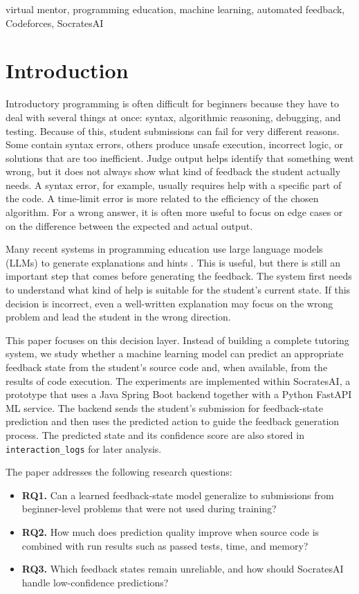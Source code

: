 \documentclass[conference]{IEEEtran}
\begin{document}
\begin{IEEEkeywords}
virtual mentor, programming education, machine learning, automated feedback, Codeforces, SocratesAI
\end{IEEEkeywords}

\section{Introduction}

Introductory programming is often difficult for beginners because they have to deal with several things at once: syntax, algorithmic reasoning, debugging, and testing. Because of this, student submissions can fail for very different reasons. Some contain syntax errors, others produce unsafe execution, incorrect logic, or solutions that are too inefficient. Judge output helps identify that something went wrong, but it does not always show what kind of feedback the student actually needs. A syntax error, for example, usually requires help with a specific part of the code. A time-limit error is more related to the efficiency of the chosen algorithm. For a wrong answer, it is often more useful to focus on edge cases or on the difference between the expected and actual output.

Many recent systems in programming education use large language models (LLMs) to generate explanations and hints \cite{Denny2024,Ahamed2025,CodeAid2024,Iris2024}. This is useful, but there is still an important step that comes before generating the feedback. The system first needs to understand what kind of help is suitable for the student's current state. If this decision is incorrect, even a well-written explanation may focus on the wrong problem and lead the student in the wrong direction.

This paper focuses on this decision layer. Instead of building a complete tutoring system, we study whether a machine learning model can predict an appropriate feedback state from the student's source code and, when available, from the results of code execution. The experiments are implemented within SocratesAI, a prototype that uses a Java Spring Boot backend together with a Python FastAPI ML service. The backend sends the student's submission for feedback-state prediction and then uses the predicted action to guide the feedback generation process. The predicted state and its confidence score are also stored in \texttt{interaction\_logs} for later analysis.

The paper addresses the following research questions:
\begin{itemize}
    \item \textbf{RQ1.} Can a learned feedback-state model generalize to submissions from beginner-level problems that were not used during training?
    \item \textbf{RQ2.} How much does prediction quality improve when source code is combined with run results such as passed tests, time, and memory?
    \item \textbf{RQ3.} Which feedback states remain unreliable, and how should SocratesAI handle low-confidence predictions?
\end{itemize}
\end{document}
